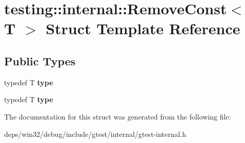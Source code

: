 \hypertarget{structtesting_1_1internal_1_1_remove_const}{}\section{testing\+:\+:internal\+:\+:Remove\+Const$<$ T $>$ Struct Template Reference}
\label{structtesting_1_1internal_1_1_remove_const}
\subsection*{Public Types}
\begin{DoxyCompactItemize}
\item 
\hypertarget{structtesting_1_1internal_1_1_remove_const_a1be32027ea4edcc0d15abd59aba4a97f}{}typedef T {\bfseries type}\label{structtesting_1_1internal_1_1_remove_const_a1be32027ea4edcc0d15abd59aba4a97f}

\item 
\hypertarget{structtesting_1_1internal_1_1_remove_const_a1be32027ea4edcc0d15abd59aba4a97f}{}typedef T {\bfseries type}\label{structtesting_1_1internal_1_1_remove_const_a1be32027ea4edcc0d15abd59aba4a97f}

\end{DoxyCompactItemize}


The documentation for this struct was generated from the following file\+:\begin{DoxyCompactItemize}
\item 
deps/win32/debug/include/gtest/internal/gtest-\/internal.\+h\end{DoxyCompactItemize}
